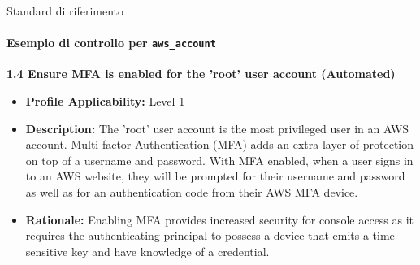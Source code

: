 \documentclass{beamer}
\begin{document}
\begin{frame}{Standard di riferimento}
    \framesubtitle{Esempio di controllo per \texttt{aws\_account}}
    \begin{mdframed}[backgroundcolor=statalegrey]
    \textbf{1.4 Ensure MFA is enabled for the 'root' user account (Automated)}
    \begin{itemize}
        \item \textbf{Profile Applicability:} Level 1
        \item \textbf{Description:} The 'root' user account is the most privileged user in an AWS account. Multi-factor Authentication (MFA) adds an extra layer of protection on top of a username and password. With MFA enabled, when a user signs in to an AWS website, they will be prompted for their username and password as well as for an authentication code from their AWS MFA device.
        \item \textbf{Rationale:} Enabling MFA provides increased security for console access as it requires the authenticating principal to possess a device that emits a time-sensitive key and have knowledge of a credential.
    \end{itemize} 
\end{mdframed}
\end{frame}
\end{document}
